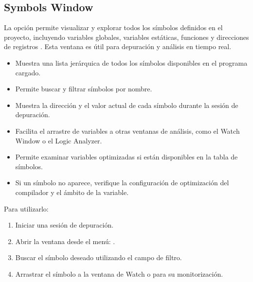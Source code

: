 \documentclass[letterpaper,10pt,english]{sphinxmanual}
\begin{document}
\subsection{Symbols Window}
\label{\detokenize{cmsis-rtos:symbols-window}}
\sphinxAtStartPar
La opción  permite visualizar y explorar todos los símbolos definidos en el proyecto, incluyendo variables globales, variables estáticas, funciones y direcciones de registros . Esta ventana es útil para depuración y análisis en tiempo real.
\begin{itemize}
\item {} 
\sphinxAtStartPar
Muestra una lista jerárquica de todos los símbolos disponibles en el programa cargado.

\item {} 
\sphinxAtStartPar
Permite buscar y filtrar símbolos por nombre.

\item {} 
\sphinxAtStartPar
Muestra la dirección y el valor actual de cada símbolo durante la sesión de depuración.

\item {} 
\sphinxAtStartPar
Facilita el arrastre de variables a otras ventanas de análisis, como el Watch Window o el Logic Analyzer.

\item {} 
\sphinxAtStartPar
Permite examinar variables optimizadas si están disponibles en la tabla de símbolos.

\item {} 
\sphinxAtStartPar
Si un símbolo no aparece, verifique la configuración de optimización del compilador y el ámbito de la variable.

\end{itemize}

\sphinxAtStartPar
Para utilizarlo:
\begin{enumerate}
%
\item {} 
\sphinxAtStartPar
Iniciar una sesión de depuración.

\item {} 
\sphinxAtStartPar
Abrir la ventana desde el menú: .

\item {} 
\sphinxAtStartPar
Buscar el símbolo deseado utilizando el campo de filtro.

\item {} 
\sphinxAtStartPar
Arrastrar el símbolo a la ventana de Watch o  para su monitorización.

\end{enumerate}
\end{document}
